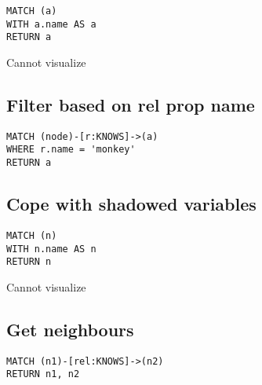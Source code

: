 \begin{lstlisting}
MATCH (a)
WITH a.name AS a
RETURN a
\end{lstlisting}

Cannot visualize
\subsection{Filter based on rel prop name}

\begin{lstlisting}
MATCH (node)-[r:KNOWS]->(a)
WHERE r.name = 'monkey'
RETURN a
\end{lstlisting}

\subsection{Cope with shadowed variables}

\begin{lstlisting}
MATCH (n)
WITH n.name AS n
RETURN n
\end{lstlisting}

Cannot visualize
\subsection{Get neighbours}

\begin{lstlisting}
MATCH (n1)-[rel:KNOWS]->(n2)
RETURN n1, n2
\end{lstlisting}

